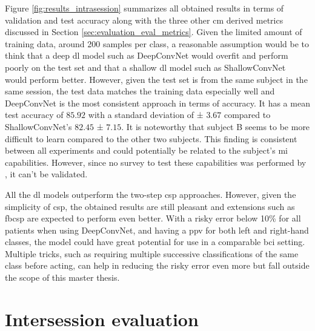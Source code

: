 Figure \ref{fig:results_intrasession} summarizes all obtained results in terms of validation and test accuracy along with the three other \gls{cm} derived metrics discussed in Section \ref{sec:evaluation_eval_metrics}.
Given the limited amount of training data, around 200 samples per class, a reasonable assumption would be to think that a deep \gls{dl} model such as DeepConvNet would overfit and perform poorly on the test set and that a shallow \gls{dl} model such as ShallowConvNet would perform better.
However, given the test set is from the same subject in the same session, the test data matches the training data especially well and DeepConvNet is the most consistent approach in terms of accuracy.
It has a mean test accuracy of $85.92$ with a standard deviation of ± $3.67$ compared to ShallowConvNet's $82.45$ ± $7.15$.
It is noteworthy that subject B seems to be more difficult to learn compared to the other two subjects.
This finding is consistent between all experiments and could potentially be related to the subject's \gls{mi} capabilities.
However, since no survey to test these capabilities was performed by \citet{eeg_data}, it can't be validated.

All the \gls{dl} models outperform the two-step \gls{csp} approaches.
However, given the simplicity of \gls{csp}, the obtained results are still pleasant and extensions such as \gls{fbcsp} are expected to perform even better.
With a risky error below 10\% for all patients when using DeepConvNet, and having a \gls{ppv} for both left and right-hand classes, the model could have great potential for use in a comparable \gls{bci} setting.
Multiple tricks, such as requiring multiple successive classifications of the same class before acting, can help in reducing the risky error even more but fall outside the scope of this master thesis.




\section{Intersession evaluation}
\label{sec:evaluation_intersession}


